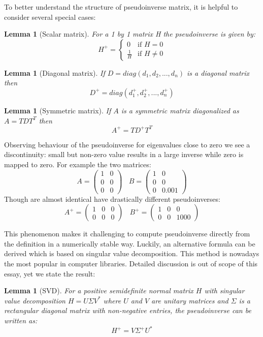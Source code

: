 \documentclass[a4paper,11pt]{article}
\theoremstyle{break}
\newtheorem{lemma}[theorem]{Lemma}
\begin{document}
To better understand the structure of pseudoinverse matrix, it is helpful to consider several special cases:
\begin{lemma}[Scalar matrix]
    For a 1 by 1 matrix H the pseudoinverse is given by:
    $$ H^+ = \begin{cases}
        0~~~           \text{ if } H = 0\\
        \frac{1}{H}~~ \text{ if } H \neq 0
    \end{cases}$$
\end{lemma}
\begin{lemma}[Diagonal matrix]
    If $D = diag(d_1, d_2, ..., d_n)$ is a diagonal matrix then
    $$ D^+ = diag(d_1^+, d_2^+, ..., d_n^+) $$
\end{lemma}
\begin{lemma}[Symmetric matrix]
    If $A$ is a symmetric matrix diagonalized as $A = T D T^T $ then
    $$ A^+ = T D^+ T^T$$
\end{lemma}

Observing behaviour of the pseudoinverse for eigenvalues close to zero we see a discontinuity: small but non-zero value results in a large inverse while zero is mapped to zero. For example the two matrices:
$$ A = \left( \begin{matrix}
1 & 0 \\
0 & 0 \\
0 & 0
\end{matrix} \right) ~~~~
B = \left( \begin{matrix}
1 & 0 \\
0 & 0 \\
0 & 0.001
\end{matrix} \right)$$
Though are almost identical have drastically different pseudoinverses:
$$ A^+ = \left( \begin{matrix}
1 & 0 & 0\\
0 & 0 & 0
\end{matrix} \right) ~~~~
B^+ = \left( \begin{matrix}
1 & 0 & 0\\
0 & 0 & 1000
\end{matrix} \right)$$

This phenomenon makes it challenging to compute pseudoinverse directly from the definition in a numerically stable way. Luckily, an alternative formula can be derived which is based on singular value decomposition. This method is nowadays the most popular in computer libraries. Detailed discussion is out of scope of this essay, yet we state the result:
\begin{lemma}[SVD]
    For a positive semidefinite normal matrix $H$ with singular value decomposition $H = U \Sigma V^*$ where $U$ and $V$ are unitary matrices and $\Sigma$ is a rectangular diagonal matrix with non-negative entries, the pseudoinverse can be written as:
    $$ H^+ = V \Sigma^+ U^* $$
\end{lemma}
\end{document}
